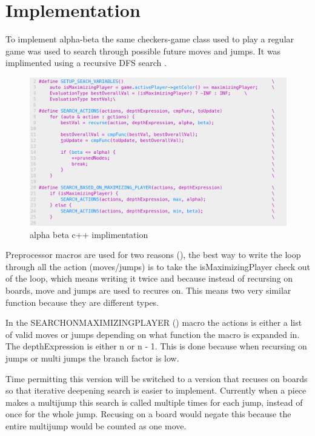 \documentclass{article}
\begin{document}
\section{Implementation}

To implement alpha-beta the same checkers-game class used to play a regular
game was used to search through possible future moves and jumps. It was implimented
using a recursive DFS search .

\begin{figure}
    \includegraphics[width=\linewidth]{images/alpha-beta-code.png}
    \caption{alpha beta c++ implimentation}
    \label{fig:ab-code}
\end{figure}

Preprocessor macros are used for two reasons (), the best way to write the loop
through all the action (moves/jumps) is to take the isMaximizingPlayer check
out of the loop, which means writing it twice and because instead of recursing
on boards, move and jumps are used to recures on. This means two very similar
function because they are different types.

In the SEARCH\textunderscore{}ON\textunderscore{}MAXIMIZING\textunderscore{}PLAYER ()
macro the actions is either a list of valid
moves or jumps depending on what function the macro is expanded in. The
depthExpression is either n or n - 1. This is done because when recursing on
jumps or multi jumps the branch factor is low.

Time permitting this version
will be switched to a version that recuses on boards so that iterative
deepening search is easier to implement. Currently when a piece makes a
multijump this search is called multiple times for each jump, instead of once
for the whole jump. Recusing on a board would negate this because the entire
multijump would be counted as one move.
\end{document}

